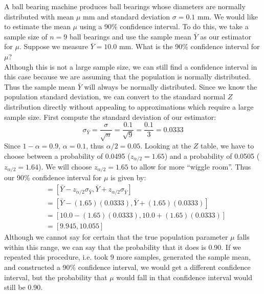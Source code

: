 \documentclass[notes.tex]{subfiles}
\begin{document}
\begin{example}A ball bearing machine produces ball bearings whose diameters are normally distributed with mean $\mu$ mm and standard deviation $\sigma = 0.1$ mm. We would like to estimate the mean $\mu$ using a 90\% confidence interval. To do this, we take a sample size of $n = 9$ ball bearings and use the sample mean $\bar{Y}$ as our estimator for $\mu$. Suppose we measure $\bar{Y} = 10.0$ mm. What is the 90\% confidence interval for $\mu$?\\

Although this is not a large sample size, we can still find a confidence interval in this case because we are assuming that the population is normally distributed. Thus the sample mean $\bar{Y}$ will always be normally distributed. Since we know the population standard deviation, we can convert to the standard normal $Z$ distribution directly without appealing to approximations which require a large sample size. First compute the standard deviation of our estimator:
\[
\sigma_{\bar{Y}} = \frac{\sigma}{\sqrt{n}} = \frac{0.1}{\sqrt{9}} = \frac{0.1}{3} = 0.0333
\]
Since $1 - \alpha = 0.9$, $\alpha = 0.1$, thus $\alpha / 2 = 0.05$. Looking at the $Z$ table, we have to choose between a probability of 0.0495 ($z_{\alpha/2} = 1.65$) and a probability of 0.0505 ($z_{\alpha/2} = 1.64$). We will choose $z_{\alpha/2} = 1.65$ to allow for more ``wiggle room''. Thus our 90\% confidence interval for $\mu$ is given by:
\begin{align*}
[\bar{Y}_L, \bar{Y}_U] &= [ \bar{Y} - z_{\alpha/2} \sigma_{\bar{Y}}, \bar{Y} + z_{\alpha/2} \sigma_{\bar{Y}} ] \\
&= [ \bar{Y} - (1.65)(0.0333), \bar{Y} + (1.65)(0.0333) ] \\
&= [ 10.0 - (1.65)(0.0333), 10.0 + (1.65)(0.0333) ] \\
&= [9.945, 10.055]
\end{align*}
Although we cannot say for certain that the true population parameter $\mu$ falls within this range, we can say that the probability that it does is 0.90. If we repeated this procedure, i.e. took 9 more samples, generated the sample mean, and constructed a 90\% confidence interval, we would get a different confidence interval, but the probability that $\mu$ would fall in that confidence interval would still be 0.90.
\end{example}
\end{document}
